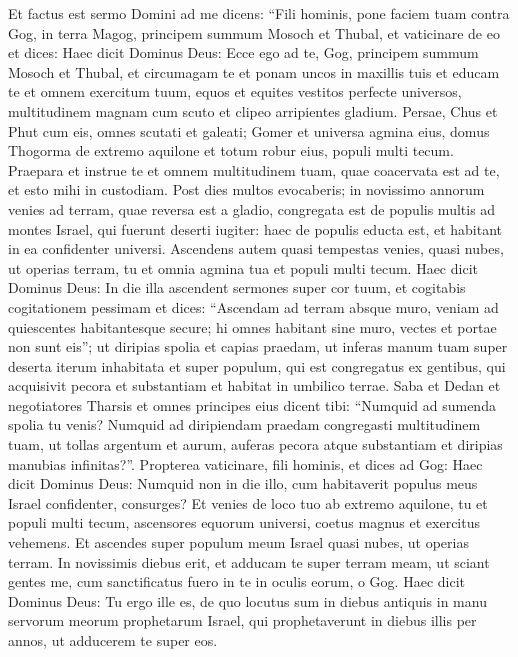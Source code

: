 \begin{biblechapter}  
\verse Et factus est sermo Domini ad me dicens: 
\verse “Fili hominis, pone faciem tuam contra Gog, in terra Magog, principem summum Mosoch et Thubal, et vaticinare de eo 
\verse et dices: Haec dicit Dominus Deus: Ecce ego ad te, Gog, principem summum Mosoch et Thubal, 
\verse et circumagam te et ponam uncos in maxillis tuis et educam te et omnem exercitum tuum, equos et equites vestitos perfecte universos, multitudinem magnam cum scuto et clipeo arripientes gladium.  
\verse Persae, Chus et Phut cum eis, omnes scutati et galeati; 
\verse Gomer et universa agmina eius, domus Thogorma de extremo aquilone et totum robur eius, populi multi tecum. 
\verse Praepara et instrue te et omnem multitudinem tuam, quae coacervata est ad te, et esto mihi in custodiam. 
\verse Post dies multos evocaberis; in novissimo annorum venies ad terram, quae reversa est a gladio, congregata est de populis multis ad montes Israel, qui fuerunt deserti iugiter: haec de populis educta est, et habitant in ea confidenter universi. 
\verse Ascendens autem quasi tempestas venies, quasi nubes, ut operias terram, tu et omnia agmina tua et populi multi tecum. 
\verse Haec dicit Dominus Deus: In die illa ascendent sermones super cor tuum, et cogitabis cogitationem pessimam 
\verse et dices: “Ascendam ad terram absque muro, veniam ad quiescentes habitantesque secure; hi omnes habitant sine muro, vectes et portae non sunt eis”; 
\verse ut diripias spolia et capias praedam, ut inferas manum tuam super deserta iterum inhabitata et super populum, qui est congregatus ex gentibus, qui acquisivit pecora et substantiam et habitat in umbilico terrae. 
\verse Saba et Dedan et negotiatores Tharsis et omnes principes eius dicent tibi: “Numquid ad sumenda spolia tu venis? Numquid ad diripiendam praedam congregasti multitudinem tuam, ut tollas argentum et aurum, auferas pecora atque substantiam et diripias manubias infinitas?”. 
\verse Propterea vaticinare, fili hominis, et dices ad Gog: Haec dicit Dominus Deus: Numquid non in die illo, cum habitaverit populus meus Israel confidenter, consurges? 
\verse Et venies de loco tuo ab extremo aquilone, tu et populi multi tecum, ascensores equorum universi, coetus magnus et exercitus vehemens. 
\verse Et ascendes super populum meum Israel quasi nubes, ut operias terram. In novissimis diebus erit, et adducam te super terram meam, ut sciant gentes me, cum sanctificatus fuero in te in oculis eorum, o Gog. 
\verse Haec dicit Dominus Deus: Tu ergo ille es, de quo locutus sum in diebus antiquis in manu servorum meorum prophetarum Israel, qui prophetaverunt in diebus illis per annos, ut adducerem te super eos. 

\end{biblechapter}
